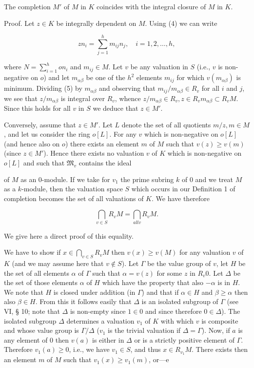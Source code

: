 The completion $M'$ of $M$ in $K$ coincides with the integral closure of $M$ in $K$.

Proof. Let $z \in K$ be integrally dependent on $M$. Using (4) we can write

$$zn_i = \sum_{j=1}^{h} m_{ij} n_j, \quad i = 1, 2, \dots, h,$$

where $N = \sum_{i=1}^{h} o n_i$ and $m_{ij} \in M$. Let $v$ be any valuation in $S$ (i.e., $v$ is non-negative on $o$) and let $m_{\alpha\beta}$ be one of the $h^2$ elements $m_{ij}$ for which $v(m_{\alpha\beta})$ is minimum. Dividing (5) by $m_{\alpha\beta}$ and observing that $m_{ij}/m_{\alpha\beta} \in R_v$ for all $i$ and $j$, we see that $z/m_{\alpha\beta}$ is integral over $R_v$, whence $z/m_{\alpha\beta} \in R_v, z \in R_v m_{\alpha\beta} \subset R_v M$. Since this holds for all $v$ in $S$ we deduce that $z \in M'$.

Conversely, assume that $z \in M'$. Let $L$ denote the set of all quotients $m/z, m \in M$, and let us consider the ring $o[L]$. For any $v$ which is non-negative on $o[L]$ (and hence also on $o$) there exists an element $m$ of $M$ such that $v(z) \geq v(m)$ (since $z \in M'$). Hence there exists no valuation $v$ of $K$ which is non-negative on $o[L]$ and such that $\mathfrak{M}_v$ contains the ideal

of $M$ as an $0$-module. If we take for $v_1$ the prime subring $k$ of $0$ and we treat $M$ as a $k$-module, then the valuation space $S$ which occurs in our Definition 1 of completion becomes the set of all valuations of $K$. We have therefore

$$\bigcap_{v \in S} R_v M = \bigcap_{all v} R_v M.$$

We give here a direct proof of this equality.

We have to show if $x \in \bigcap_{v \in S} R_v M$ then $v(x) \geq v(M)$ for any valuation $v$ of $K$ (and we may assume here that $v \notin S$). Let $\Gamma$ be the value group of $v$, let $H$ be the set of all elements $\alpha$ of $\Gamma$ such that $\alpha = v(z)$ for some $z$ in $R_v 0$. Let $\Delta$ be the set of those elements $\alpha$ of $H$ which have the property that also $-\alpha$ is in $H$. We note that $H$ is closed under addition (in $\Gamma$) and that if $\alpha \in H$ and $\beta \geq \alpha$ then also $\beta \in H$. From this it follows easily that $\Delta$ is an isolated subgroup of $\Gamma$ (see VI, § 10; note that $\Delta$ is non-empty since $1 \in 0$ and since therefore $0 \in \Delta$). The isolated subgroup $\Delta$ determines a valuation $v_1$ of $K$ with which $v$ is composite and whose value group is $\Gamma/\Delta$ ($v_1$ is the trivial valuation if $\Delta = \Gamma$). Now, if $a$ is any element of $0$ then $v(a)$ is either in $\Delta$ or is a strictly positive element of $\Gamma$. Therefore $v_1(a) \geq 0$, i.e., we have $v_1 \in S$, and thus $x \in R_{v_1} M$. There exists then an element $m$ of $M$ such that $v_1(x) \geq v_1(m)$, or—e

